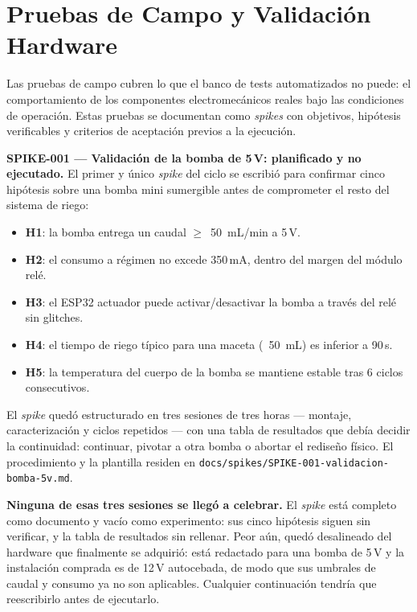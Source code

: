 \section{Pruebas de Campo y Validación Hardware}
\label{sec:testing_field}

Las pruebas de campo cubren lo que el banco de tests automatizados no puede: el
comportamiento de los componentes electromecánicos reales bajo las condiciones de
operación. Estas pruebas se documentan como \textit{spikes} con objetivos, hipótesis
verificables y criterios de aceptación previos a la ejecución.

\textbf{SPIKE-001 — Validación de la bomba de 5\,V: planificado y no ejecutado.} El
primer y único \textit{spike} del ciclo se escribió para confirmar cinco hipótesis
sobre una bomba mini sumergible antes de comprometer el resto del sistema de riego:

\begin{itemize}[leftmargin=*, label=--]
    \item \textbf{H1}: la bomba entrega un caudal $\geq$~50~mL/min a 5\,V.
    \item \textbf{H2}: el consumo a régimen no excede 350\,mA, dentro del margen del módulo relé.
    \item \textbf{H3}: el ESP32 actuador puede activar/desactivar la bomba a través del relé sin glitches.
    \item \textbf{H4}: el tiempo de riego típico para una maceta (~50~mL) es inferior a 90\,s.
    \item \textbf{H5}: la temperatura del cuerpo de la bomba se mantiene estable tras 6 ciclos consecutivos.
\end{itemize}

El \textit{spike} quedó estructurado en tres sesiones de tres horas --- montaje,
caracterización y ciclos repetidos --- con una tabla de resultados que debía decidir
la continuidad: continuar, pivotar a otra bomba o abortar el rediseño físico. El
procedimiento y la plantilla residen en
\texttt{docs/spikes/SPIKE-001-validacion-bomba-5v.md}.

\textbf{Ninguna de esas tres sesiones se llegó a celebrar.} El \textit{spike} está
completo como documento y vacío como experimento: sus cinco hipótesis siguen sin
verificar, y la tabla de resultados sin rellenar. Peor aún, quedó desalineado del
hardware que finalmente se adquirió: está redactado para una bomba de 5\,V y la
instalación comprada es de 12\,V autocebada, de modo que sus umbrales de caudal y
consumo ya no son aplicables. Cualquier continuación tendría que reescribirlo antes
de ejecutarlo.

